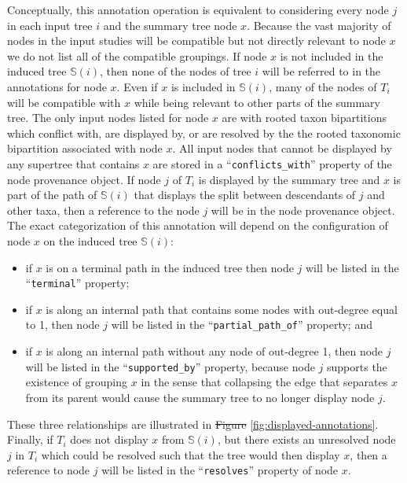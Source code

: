 \documentclass[fleqn,12pt,lineno,english]{wlpeerj}
\newcommand{\supportedby}{\texttt{supported\_by}}
\newcommand{\partialpathof}{\texttt{partial\_path\_of}}
\newcommand{\terminal}{\texttt{terminal}}
\newcommand{\conflictswith}{\texttt{conflicts\_with}}
\newcommand{\resolves}{\texttt{resolves}}
\providecommand{\DIFaddtex}[1]{{\protect\color{blue}\uwave{#1}}} %
\providecommand{\DIFdeltex}[1]{{\protect\color{red}\sout{#1}}}                      %
\providecommand{\DIFaddbegin}{} %
\providecommand{\DIFaddend}{} %
\providecommand{\DIFdelbegin}{} %
\providecommand{\DIFdelend}{} %
\providecommand{\DIFadd}[1]{\texorpdfstring{\DIFaddtex{#1}}{#1}} %
\providecommand{\DIFdel}[1]{\texorpdfstring{\DIFdeltex{#1}}{}} %
\begin{document}
Conceptually, this annotation operation is equivalent to considering
every node $j$ in each input tree $i$ and the summary tree node
$x$. Because the vast majority of nodes in the input studies will
be compatible but not directly relevant to node $x$ we do not list
all of the compatible groupings. If node $x$ is not included in the
induced tree $\mathcal{\mathbb{S}}(i)$, then none of the nodes of
tree $i$ will be referred to in the annotations for node $x$. Even
if $x$ is included in $\mathcal{\mathbb{S}}(i)$, many of the nodes
of $T_{i}$ will be compatible with $x$ while being relevant to other
parts of the summary tree. The only input nodes listed for node $x$
are with rooted taxon bipartitions which conflict with, are displayed
by, or are resolved by the the rooted taxonomic bipartition associated
with node $x$. All input nodes that cannot be displayed by any supertree
that contains $x$ are stored in a ``\conflictswith{}'' property
of the node provenance object. If node $j$ of $T_{i}$ is displayed
by the summary tree and $x$ is part of the path of $\mathcal{\mathbb{S}}(i)$
that displays the split between descendants of $j$ and other taxa,
then a reference to the node $j$ will be in the node provenance object.
The exact categorization of this annotation will depend on the configuration
of node $x$ on the induced tree $\mathcal{\mathbb{S}}(i)$:
 \begin{itemize} 
\item if $x$ is on a terminal path in the induced tree then node $j$ will
be listed in the ``\terminal{}'' property;
\item if $x$ is along an internal path that contains some nodes with out-degree
equal to 1, then node $j$ will be listed in the ``\partialpathof{}''
property; and
\item if $x$ is along an internal path without any node of out-degree 1,
then node $j$ will be listed in the ``\supportedby{}'' property,
because node $j$ supports the existence of grouping $x$ in the sense
that collapsing the edge that separates $x$ from its parent would
cause the summary tree to no longer display node $j$.
 \end{itemize} 
These three relationships are illustrated in \DIFdelbegin \DIFdel{Figure }\DIFdelend \DIFaddbegin \DIFadd{Fig. }\DIFaddend \ref{fig:displayed-annotations}.
Finally, if $T_{i}$ does not display $x$ from $\mathcal{\mathbb{S}}(i)$,
but there exists an unresolved node $j$ in $T_{i}$ which could be
resolved such that the tree would then display $x$, then a reference
to node $j$ will be listed in the ``\resolves{}'' property of node
$x$. 
\end{document}
